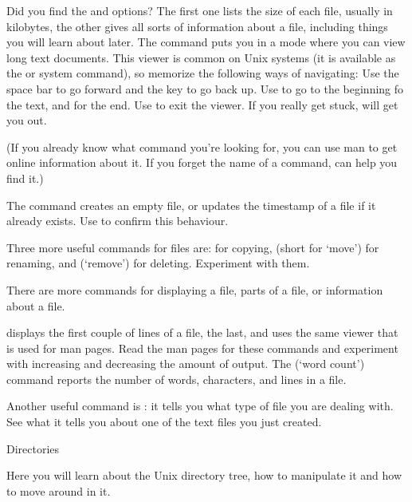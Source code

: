 {Did you find the  and 
  options? The first one lists the size of each file, usually in
  kilobytes, the other gives all sorts of information about a file,
  including things you will learn about later.}  
{The  command
  puts you in a mode where you can view long text documents. This
  viewer is common on Unix systems (it is available as the  or
   system command), so memorize the following ways of navigating: Use
  the space bar to go forward and the  key to go back up. Use
   to go to the beginning fo the text, and  for the end. Use
   to exit the viewer. If you really get stuck,  will
  get you out.}

(If you already know what command you're looking for, you can use man
to get online information about it. If you forget the name of a
command,  can help you find it.)

The  command creates an empty file, or updates the timestamp of
a file if it already exists. Use  to confirm this behaviour.

Three more useful commands for files are:  for copying, 
(short for `move') for renaming, and  (`remove') for deleting.
Experiment with them.

There are more commands for displaying a file, parts of a file, or
information about a file. 

{ displays the first couple of lines of a file,  the
  last, and  uses the same viewer that is used for man
  pages. Read the man pages for these commands and experiment with
  increasing and decreasing the amount of output. 
  The  (`word count') command reports the number of words,
  characters, and lines in a file.}{}

Another useful command is : it tells you what
type of file you are dealing with. See what it tells you about
one of the text files you just created.

 {Directories}

\begin{purpose}
  Here you will learn about the Unix directory tree, how to manipulate
  it and how to move around in it.
\end{purpose}

